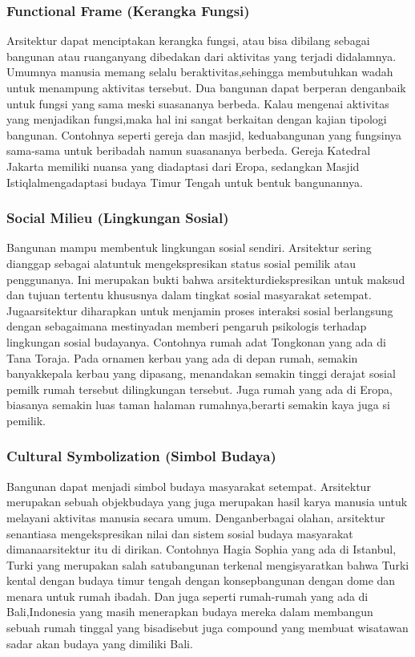 \documentclass[../manperil.tex]{subfiles}
\begin{document}
\subsubsection{Functional Frame (Kerangka Fungsi)}%
\label{sub:functional_frame_(kerangka_fungsi)}

Arsitektur dapat menciptakan kerangka fungsi, atau bisa dibilang sebagai bangunan atau ruanganyang dibedakan dari aktivitas yang terjadi didalamnya. Umumnya manusia memang selalu beraktivitas,sehingga membutuhkan wadah untuk menampung aktivitas tersebut. Dua bangunan dapat berperan denganbaik untuk fungsi yang sama meski suasananya berbeda. Kalau mengenai aktivitas yang menjadikan fungsi,maka hal ini sangat berkaitan dengan kajian tipologi bangunan. Contohnya seperti gereja dan masjid, keduabangunan yang fungsinya sama-sama untuk beribadah namun suasananya berbeda.
Gereja Katedral Jakarta memiliki nuansa yang diadaptasi dari Eropa, sedangkan Masjid Istiqlalmengadaptasi budaya Timur Tengah untuk bentuk bangunannya.


\subsubsection{Social Milieu (Lingkungan Sosial)}%
\label{sub:social_milieu_(lingkungan_sosial)}


Bangunan mampu membentuk lingkungan sosial sendiri. Arsitektur sering dianggap sebagai alatuntuk mengekspresikan status sosial pemilik atau penggunanya. Ini merupakan bukti bahwa arsitekturdiekspresikan untuk maksud dan tujuan tertentu khususnya dalam tingkat sosial masyarakat setempat. Jugaarsitektur diharapkan untuk menjamin proses interaksi sosial berlangsung dengan sebagaimana mestinyadan memberi pengaruh psikologis terhadap lingkungan sosial budayanya. Contohnya rumah adat Tongkonan yang ada di Tana Toraja. Pada ornamen kerbau yang ada di depan rumah, semakin banyakkepala kerbau yang dipasang, menandakan semakin tinggi derajat sosial pemilk rumah tersebut dilingkungan tersebut. Juga rumah yang ada di Eropa, biasanya semakin luas taman halaman rumahnya,berarti semakin kaya juga si pemilik.

\subsubsection{Cultural Symbolization (Simbol Budaya)}%
\label{sub:cultural_symbolization_(simbol_budaya)}

Bangunan dapat menjadi simbol budaya masyarakat setempat. Arsitektur merupakan sebuah objekbudaya yang juga merupakan hasil karya manusia untuk melayani aktivitas manusia secara umum. Denganberbagai olahan, arsitektur senantiasa mengekspresikan nilai dan sistem sosial budaya masyarakat dimanaarsitektur itu di dirikan. Contohnya Hagia Sophia yang ada di Istanbul, Turki yang merupakan salah satubangunan terkenal mengisyaratkan bahwa Turki kental dengan budaya timur tengah dengan konsepbangunan dengan dome dan menara untuk rumah ibadah. Dan juga seperti rumah-rumah yang ada di Bali,Indonesia yang masih menerapkan budaya mereka dalam membangun sebuah rumah tinggal yang bisadisebut juga compound yang membuat wisatawan sadar akan budaya yang dimiliki Bali.
\end{document}
